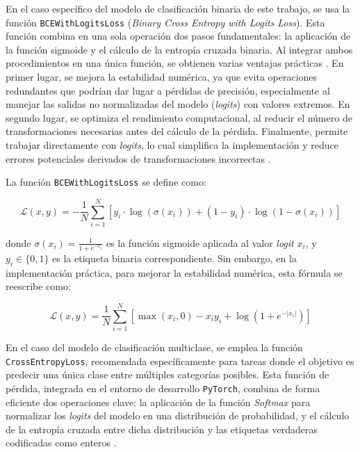En el caso específico del modelo de clasificación binaria de este trabajo, se usa la función \texttt{BCEWithLogitsLoss} (\textit{Binary Cross Entropy with Logits Loss}). Esta función combina en una sola operación dos pasos fundamentales: la aplicación de la función sigmoide y el cálculo de la entropía cruzada binaria. Al integrar ambos procedimientos en una única función, se obtienen varias ventajas prácticas \cite{datacamp_loss_function}. En primer lugar, se mejora la estabilidad numérica, ya que evita operaciones redundantes que podrían dar lugar a pérdidas de precisión, especialmente al manejar las salidas no normalizadas del modelo (\textit{logits}) con valores extremos. En segundo lugar, se optimiza el rendimiento computacional, al reducir el número de transformaciones necesarias antes del cálculo de la pérdida. Finalmente, permite trabajar directamente con \textit{logits}, lo cual simplifica la implementación y reduce errores potenciales derivados de transformaciones incorrectas \cite{bigdatafran_pytorch_classification}.

La función \texttt{BCEWithLogitsLoss} se define como:

\[
\mathcal{L}(x, y) = - \frac{1}{N} \sum_{i=1}^{N} \left[ y_i \cdot \log \left( \sigma(x_i) \right) + (1 - y_i) \cdot \log \left( 1 - \sigma(x_i) \right) \right]
\]

donde \( \sigma(x_i) = \frac{1}{1 + e^{-x_i}} \) es la función sigmoide aplicada al valor \textit{logit} \( x_i \), y \( y_i \in \{0, 1\} \) es la etiqueta binaria correspondiente. Sin embargo, en la implementación práctica, para mejorar la estabilidad numérica, esta fórmula se reescribe como:

\[
\mathcal{L}(x, y) = \frac{1}{N} \sum_{i=1}^{N} \left[ \max(x_i, 0) - x_i y_i + \log \left( 1 + e^{-\lvert x_i \rvert} \right) \right]
\]



En el caso del modelo de clasificación multiclase, se emplea la función \texttt{CrossEntropyLoss}, recomendada específicamente para tareas donde el objetivo es predecir una única clase entre múltiples categorías posibles. Esta función de pérdida, integrada en el entorno de desarrollo \texttt{PyTorch}, combina de forma eficiente dos operaciones clave: la aplicación de la función \textit{Softmax} para normalizar los \textit{logits} del modelo en una distribución de probabilidad, y el cálculo de la entropía cruzada entre dicha distribución y las etiquetas verdaderas codificadas como enteros \cite{paszke2019pytorch}.

